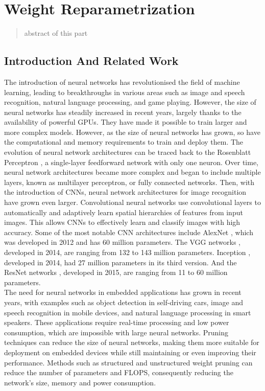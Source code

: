 \chapter{Weight Reparametrization}

\begin{abstract}
    abstract of this part
\end{abstract}

\section{Introduction And Related Work}

The introduction of neural networks has revolutionised the field of machine
learning, leading to breakthroughs in various areas such as image and speech
recognition, natural language processing, and game playing. However, the size of
neural networks has steadily increased in recent years, largely thanks to the
availability of powerful \ac{GPUs}. They have made it possible to train larger
and more complex models. However, as the size of neural networks has grown, so
have the computational and memory requirements to train and deploy them. The
evolution of neural network architectures can be traced back to the Rosenblatt
Perceptron \cite{rosenblatt1958perceptron}, a single-layer feedforward network
with only one neuron. Over time, neural network architectures became more
complex and began to include multiple layers, known as multilayer perceptron, or
fully connected networks. Then, with the introduction of \ac{CNNs}, neural
network architectures for image recognition have grown even larger.
Convolutional neural networks use convolutional layers to automatically and
adaptively learn spatial hierarchies of features from input images. This allows
\ac{CNNs} to effectively learn and classify images with high accuracy. Some of
the most notable \ac{CNN} architectures include AlexNet
\cite{DBLP:conf/nips/KrizhevskySH12}, which was developed in 2012 and has 60
million parameters. The VGG networks \cite{DBLP:journals/corr/SimonyanZ14a},
developed in 2014, are ranging from 132 to 143 million parameters. Inception
\cite{DBLP:conf/cvpr/SzegedyLJSRAEVR15}, developed in 2014, had 27 million
parameters in its third version. And the ResNet networks
\cite{DBLP:conf/cvpr/HeZRS16}, developed in 2015, are ranging from 11 to 60
million parameters. \\


The need for neural networks in embedded applications has grown in recent years,
with examples such as object detection in self-driving cars, image and speech
recognition in mobile devices, and natural language processing in smart
speakers. These applications require real-time processing and low power
consumption, which are impossible with large neural networks. Pruning techniques
can reduce the size of neural networks, making them more suitable for deployment
on embedded devices while still maintaining or even improving their performance.
Methods such as structured and unstructured weight pruning can reduce the number
of parameters and FLOPS, consequently reducing the network's size, memory and
power consumption.\\


